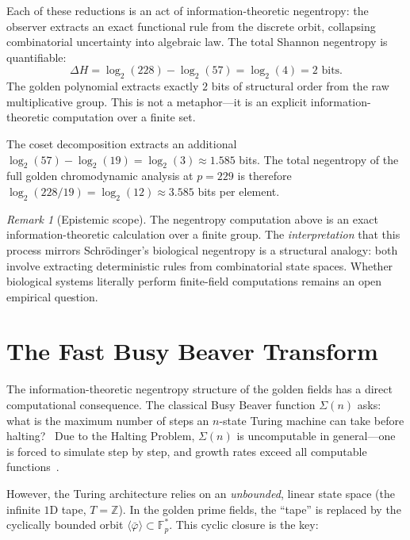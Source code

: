 \documentclass[12pt,oneside]{article}
\theoremstyle{principia}
\theoremstyle{definition}
\theoremstyle{remark}
\newtheorem{remark}[theorem]{Remark}
\begin{document}
Each of these reductions is an act of information-theoretic negentropy: the observer
extracts an exact functional rule from the discrete orbit,
collapsing combinatorial uncertainty into algebraic law. The
total Shannon negentropy is quantifiable:
\[
\Delta H = \log_2(228) - \log_2(57) = \log_2(4) = 2 \text{ bits.}
\]
The golden polynomial extracts exactly $2$ bits of structural
order from the raw multiplicative group. This is not a metaphor---it
is an explicit information-theoretic computation over a finite set.

The coset decomposition extracts an additional
$\log_2(57) - \log_2(19) = \log_2(3) \approx 1.585$ bits. The
total negentropy of the full golden chromodynamic analysis at
$p = 229$ is therefore $\log_2(228/19) = \log_2(12) \approx 3.585$
bits per element.

\begin{remark}[Epistemic scope]
The negentropy computation above is an exact information-theoretic
calculation over a finite group. The \emph{interpretation} that this
process mirrors Schr\"odinger's biological negentropy is a structural
analogy: both involve extracting deterministic rules from combinatorial
state spaces. Whether biological systems literally perform finite-field
computations remains an open empirical question.
\end{remark}

\section{The Fast Busy Beaver Transform}
\label{sec:fbbt}

The information-theoretic negentropy structure of the golden fields has a direct
computational consequence. The classical Busy Beaver function
$\Sigma(n)$ asks: what is the maximum number of steps an $n$-state
Turing machine can take before halting?~\cite{rado1962} Due to the
Halting Problem, $\Sigma(n)$ is uncomputable in general---one is
forced to simulate step by step, and growth rates exceed all
computable functions~\cite{aaronson2020}.

However, the Turing architecture relies on an \emph{unbounded},
linear state space (the infinite $1$D tape, $T = \mathbb{Z}$).
In the golden prime fields, the ``tape'' is replaced by the
cyclically bounded orbit $\langle\bar\varphi\rangle \subset
\mathbb{F}_p^*$. This cyclic closure is the key:
\end{document}
